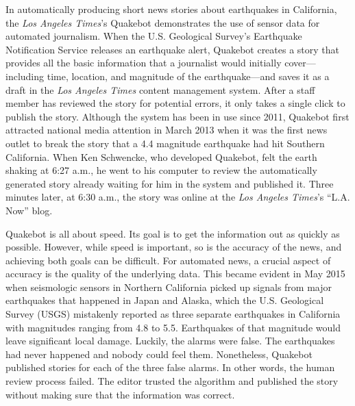 \documentclass[notoc, symmetric, nobib, nols]{towcenter-book}
\begin{document}
In automatically producing short news stories about earthquakes in California, the \textit{Los Angeles Times}’s Quakebot demonstrates the use of sensor data for automated journalism. When the U.S. Geological Survey’s Earthquake Notification Service releases an earthquake alert, Quakebot creates a story that provides all the basic information that a journalist would initially cover---including time, location, and magnitude of the earthquake---and saves it as a draft in the \textit{Los Angeles Times} content management system. After a staff member has reviewed the story for potential errors, it only takes a single click to publish the story. Although the system has been in use since 2011, Quakebot first attracted national media attention in March 2013 when it was the first news outlet to break the story that a 4.4 magnitude earthquake had hit Southern California. When Ken Schwencke, who developed Quakebot, felt the earth shaking at 6:27 a.m., he went to his computer to review the automatically generated story already waiting for him in the system and published it. Three minutes later, at 6:30 a.m., the story was online at the \textit{Los Angeles Times}’s ``L.A. Now'' blog.\cite{pluc14}

Quakebot is all about speed. Its goal is to get the information out as quickly as possible. However, while speed is important, so is the accuracy of the news, and achieving both goals can be difficult. For automated news, a crucial aspect of accuracy is the quality of the underlying data. This became evident in May 2015 when seismologic sensors in Northern California picked up signals from major earthquakes that happened in Japan and Alaska, which the U.S. Geological Survey (USGS) mistakenly reported as three separate earthquakes in California with magnitudes ranging from 4.8 to 5.5. Earthquakes of that magnitude would leave significant local damage. Luckily, the alarms were false. The earthquakes had never happened and nobody could feel them. Nonetheless, Quakebot published stories for each of the three false alarms. In other words, the human review process failed. The editor trusted the algorithm and published the story without making sure that the information was correct.\cite{mercer15}
\end{document}
